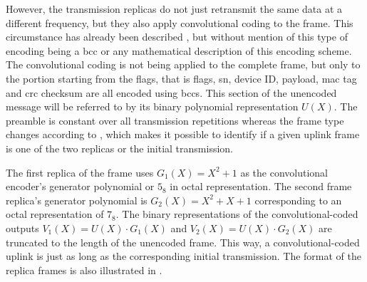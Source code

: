 However, the transmission replicas do not just retransmit the same data at a different frequency, but they also apply convolutional coding to the frame.
This circumstance has already been described \cite{disk91radioprotocol}, but without mention of this type of encoding being a \gls{bcc} or any mathematical description of this encoding scheme.
The convolutional coding is not being applied to the complete frame, but only to the portion starting from the flags, that is flags, \gls{sn}, device ID, payload, \gls{mac} tag and \gls{crc} checksum are all encoded using \glspl{bcc}.
This section of the unencoded message will be referred to by its binary polynomial representation $U(X)$.
The preamble is constant over all transmission repetitions whereas the frame type changes according to , which makes it possible to identify if a given uplink frame is one of the two replicas or the initial transmission.

The first replica of the frame uses $G_1(X) = X^2 + 1$ as the convolutional encoder's generator polynomial or $5_8$ in octal representation.
The second frame replica's generator polynomial is $G_2(X) = X^2 + X + 1$ corresponding to an octal representation of $7_8$.
The binary representations of the convolutional-coded outputs $V_1(X) = U(X) \cdot G_1(X)$ and $V_2(X) = U(X) \cdot G_2(X)$ are truncated to the length of the unencoded frame.
This way, a convolutional-coded uplink is just as long as the corresponding initial transmission.
The format of the replica frames is also illustrated in .

